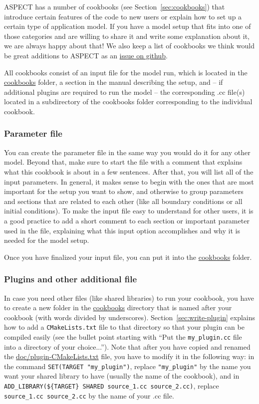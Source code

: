 \documentclass{article}
\newcommand{\aspect}{\textsc{ASPECT}}
\begin{document}
\aspect{} has a number of cookbooks (see Section~\ref{sec:cookbooks}) that introduce certain features of the code
to new users or explain how to set up a certain type of application model.
If you have a model setup that fits into one of those categories and are willing
to share it and write some explanation about it, we are always happy about that!
We also keep a list of cookbooks we think would be great additions to \aspect{} as
an \href{https://github.com/geodynamics/aspect/issues/2110}{issue on github}.

All cookbooks consist of an input file for the model run, which is located in the
\href{cookbooks/.}{cookbooks} folder, a section in
the manual describing the setup, and -- if additional plugins are required to run the
model -- the corresponding .cc file(s) located in a subdirectory of the cookbooks
folder corresponding to the individual cookbook.

\subsubsection{Parameter file}

You can create the parameter file in the same way you would do it for any other model. 
Beyond that, make sure to start the file with a comment that explains what this cookbook
is about in a few sentences. After that, you will list all of the input parameters.
In general, it makes sense to begin with the ones that are most important for the
setup you want to show, and otherwise to group parameters and sections that are related to
each other (like all boundary conditions or all initial conditions).
To make the input file easy to understand for other users, it is a good practice to
add a short comment to each section or important parameter used in the file, explaining
what this input option accomplishes and why it is needed for the model setup.

Once you have finalized your input file, you can put it into the \href{cookbooks/.}{cookbooks} folder.

\subsubsection{Plugins and other additional file}

In case you need other files (like shared libraries) to run your cookbook, you have to create a 
new folder in the \href{cookbooks/.}{cookbooks} directory that is named after your cookbook 
(with words divided by underscores). 
Section~\ref{sec:write-plugin} explains how to add a \texttt{CMakeLists.txt} file to that
directory so that your plugin can be compiled easily (see the bullet point starting with 
``Put the  \texttt{my\_plugin.cc} file into a directory of your choice...''). 
Note that after you have copied and renamed the \url{doc/plugin-CMakeLists.txt} file, 
you have to modify it in the following way: in the command \verb!SET(TARGET "my_plugin")!, 
replace \verb!"my_plugin"! by the name you want your shared library to have (usually the name of the cookbook), and in 
\verb!ADD_LIBRARY(${TARGET} SHARED source_1.cc source_2.cc)!, replace \verb!source_1.cc source_2.cc!
by the name of your .cc file. 
\end{document}
